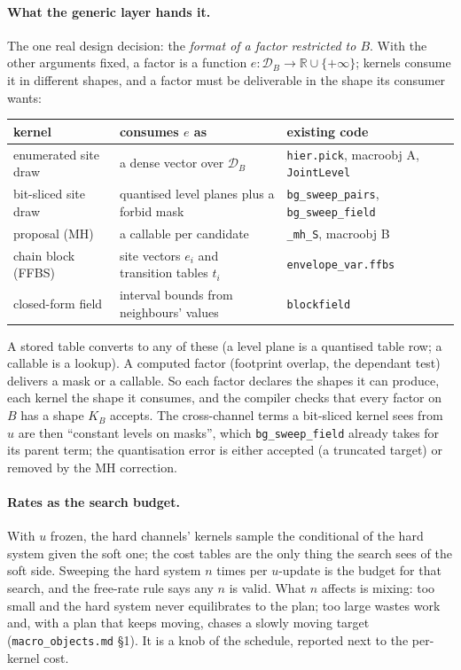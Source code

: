 \documentclass[11pt]{article}
\newcommand{\R}{\mathbb{R}}
\newcommand{\1}{\mathds{1}}
\newcommand{\Dom}{\mathcal{D}}
\begin{document}
\paragraph{What the generic layer hands it.} The one real design decision: the
\emph{format of a factor restricted to $B$}. With the other arguments fixed, a
factor is a function $e : \Dom_B \to \R \cup \{+\infty\}$; kernels consume it in
different shapes, and a factor must be deliverable in the shape its consumer
wants:
\begin{center}
\small
\begin{tabular}{@{}lll@{}}
\toprule
kernel & consumes $e$ as & existing code \\
\midrule
enumerated site draw & a dense vector over $\Dom_B$ & \texttt{hier.pick}, macroobj A, \texttt{JointLevel} \\
bit-sliced site draw & quantised level planes plus a forbid mask & \texttt{bg\_sweep\_pairs}, \texttt{bg\_sweep\_field} \\
proposal (MH) & a callable per candidate & \texttt{\_mh\_S}, macroobj B \\
chain block (FFBS) & site vectors $e_i$ and transition tables $t_i$ & \texttt{envelope\_var.ffbs} \\
closed-form field & interval bounds from neighbours' values & \texttt{blockfield} \\
\bottomrule
\end{tabular}
\end{center}
A stored table converts to any of these (a level plane is a quantised table
row; a callable is a lookup). A computed factor (footprint overlap, the
dependant test) delivers a mask or a callable. So each factor declares the
shapes it can produce, each kernel the shape it consumes, and the compiler
checks that every factor on $B$ has a shape $K_B$ accepts. The cross-channel
terms a bit-sliced kernel sees from $u$ are then ``constant levels on masks'',
which \texttt{bg\_sweep\_field} already takes for its parent term; the
quantisation error is either accepted (a truncated target) or removed by the
MH correction.

\paragraph{Rates as the search budget.} With $u$ frozen, the hard channels'
kernels sample the conditional of the hard system given the soft one; the cost
tables are the only thing the search sees of the soft side. Sweeping the hard
system $n$ times per $u$-update is the budget for that search, and the free-rate
rule says any $n$ is valid. What $n$ affects is mixing: too small and the hard
system never equilibrates to the plan; too large wastes work and, with a
plan that keeps moving, chases a slowly moving target
(\texttt{macro\_objects.md} \S1). It is a knob of the schedule, reported next to
the per-kernel cost.
\end{document}
